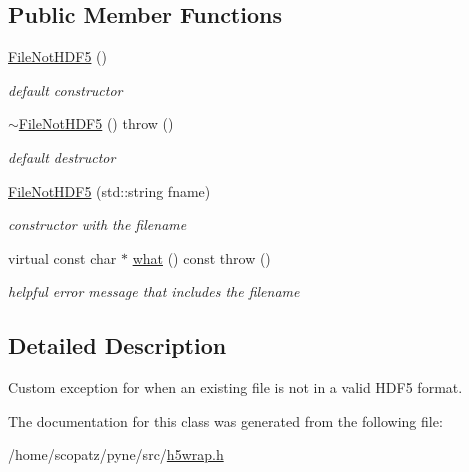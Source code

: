 \subsection*{Public Member Functions}
\begin{DoxyCompactItemize}
\item 
\hypertarget{classh5wrap_1_1_file_not_h_d_f5_a3fa40cb39abaa241e80ee97a13e69815}{\hyperlink{classh5wrap_1_1_file_not_h_d_f5_a3fa40cb39abaa241e80ee97a13e69815}{File\-Not\-H\-D\-F5} ()}\label{classh5wrap_1_1_file_not_h_d_f5_a3fa40cb39abaa241e80ee97a13e69815}

\begin{DoxyCompactList}\small\item\em default constructor \end{DoxyCompactList}\item 
\hypertarget{classh5wrap_1_1_file_not_h_d_f5_a55276b2bc97da82f25a0718327b00742}{\hyperlink{classh5wrap_1_1_file_not_h_d_f5_a55276b2bc97da82f25a0718327b00742}{$\sim$\-File\-Not\-H\-D\-F5} ()  throw ()}\label{classh5wrap_1_1_file_not_h_d_f5_a55276b2bc97da82f25a0718327b00742}

\begin{DoxyCompactList}\small\item\em default destructor \end{DoxyCompactList}\item 
\hypertarget{classh5wrap_1_1_file_not_h_d_f5_ac6f9e6588f3a55f26fe6cd13ab75425b}{\hyperlink{classh5wrap_1_1_file_not_h_d_f5_ac6f9e6588f3a55f26fe6cd13ab75425b}{File\-Not\-H\-D\-F5} (std\-::string fname)}\label{classh5wrap_1_1_file_not_h_d_f5_ac6f9e6588f3a55f26fe6cd13ab75425b}

\begin{DoxyCompactList}\small\item\em constructor with the filename \end{DoxyCompactList}\item 
\hypertarget{classh5wrap_1_1_file_not_h_d_f5_afce2273e3c8d54802598bdc30cdedec2}{virtual const char $\ast$ \hyperlink{classh5wrap_1_1_file_not_h_d_f5_afce2273e3c8d54802598bdc30cdedec2}{what} () const   throw ()}\label{classh5wrap_1_1_file_not_h_d_f5_afce2273e3c8d54802598bdc30cdedec2}

\begin{DoxyCompactList}\small\item\em helpful error message that includes the filename \end{DoxyCompactList}\end{DoxyCompactItemize}


\subsection{Detailed Description}
Custom exception for when an existing file is not in a valid H\-D\-F5 format. 

The documentation for this class was generated from the following file\-:\begin{DoxyCompactItemize}
\item 
/home/scopatz/pyne/src/\hyperlink{h5wrap_8h}{h5wrap.\-h}\end{DoxyCompactItemize}
